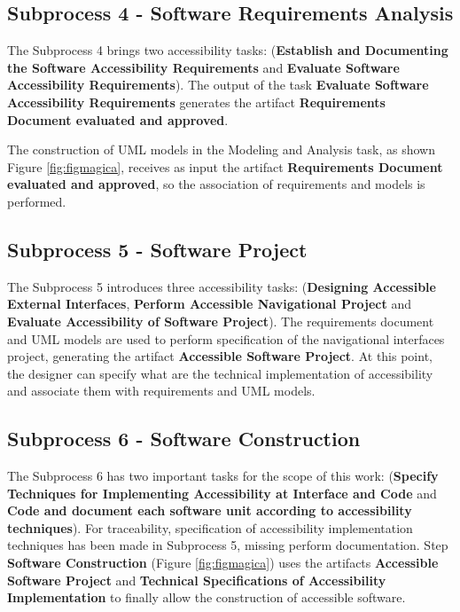 \documentclass[10pt, conference, compsocconf]{IEEEtran}
\begin{document}
\subsection{Subprocess 4 - Software Requirements Analysis}

The Subprocess 4 brings two accessibility tasks:  (\textbf{Establish and
Documenting the Software Accessibility Requirements } and \textbf{Evaluate
Software Accessibility Requirements}). The output of the task \textbf{Evaluate
Software Accessibility Requirements} generates the artifact \textbf {Requirements Document  
evaluated and approved}.

The construction of UML models in the Modeling and Analysis task, as shown
Figure \ref{fig:figmagica}, receives as input the artifact \textbf{Requirements Document  
evaluated and approved}, so the association of
requirements and models is performed.

\subsection{Subprocess 5 - Software Project}

The Subprocess 5 introduces three accessibility tasks:  (\textbf{Designing
Accessible External Interfaces}, \textbf{Perform Accessible Navigational Project} and 
\textbf {Evaluate Accessibility of Software Project}). The
requirements document and UML models are used to perform
specification of the navigational interfaces project, generating the artifact
\textbf{Accessible Software Project}. At this point, the designer can specify
what are the technical implementation of accessibility and associate them with
requirements and UML models.


\subsection{Subprocess 6 - Software Construction}

The Subprocess 6 has two important tasks for the scope of this work:
(\textbf{Specify Techniques for Implementing Accessibility
at Interface and Code} and \textbf {Code and document each software unit
according to accessibility techniques}). For traceability,
specification of accessibility implementation techniques has been made in
Subprocess 5, missing perform documentation. Step \textbf{Software Construction} (Figure \ref {fig:figmagica}) uses the
artifacts \textbf{Accessible Software Project} and \textbf{Technical Specifications
of Accessibility Implementation} to finally allow the construction of
accessible software.
\end{document}
